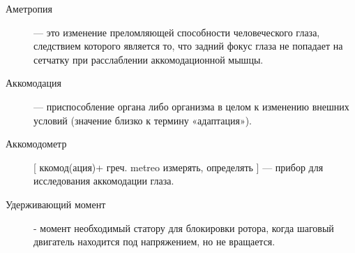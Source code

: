 \begin{description}
\item[Аметропия] --- это изменение преломляющей способности человеческого глаза, следствием которого является то, что задний фокус глаза не попадает на сетчатку при расслаблении аккомодационной мышцы.\cite{b_1}

\item[Аккомодация] --- приспособление органа либо организма в целом к изменению внешних условий (значение близко к термину «адаптация»).\cite{b_2}

\item[Аккомодометр][ ккомод(ация)+ греч. metreo измерять, определять ] --- прибор для исследования аккомодации глаза.\cite{b_3}
\item[Удерживающий момент] - момент необходимый статору для блокировки ротора, когда шаговый двигатель находится под напряжением, но не вращается.\cite{s_3}
\end{description}
